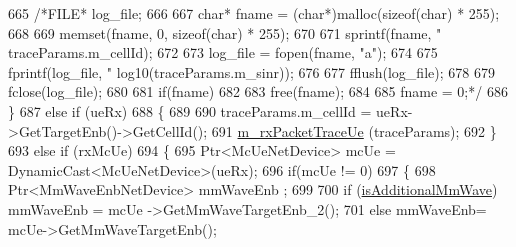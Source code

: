 \begin{DoxyCode}
665                                          \textcolor{comment}{/*FILE* log\_file;}
666 \textcolor{comment}{}
667 \textcolor{comment}{                                        char* fname = (char*)malloc(sizeof(char) * 255);}
668 \textcolor{comment}{}
669 \textcolor{comment}{                                        memset(fname, 0, sizeof(char) * 255);}
670 \textcolor{comment}{}
671 \textcolor{comment}{                                        sprintf(fname, "%
       traceParams.m\_cellId);}
672 \textcolor{comment}{}
673 \textcolor{comment}{                                        log\_file = fopen(fname, "a");}
674 \textcolor{comment}{}
675 \textcolor{comment}{                                        fprintf(log\_file, "%
      log10(traceParams.m\_sinr));}
676 \textcolor{comment}{}
677 \textcolor{comment}{                                        fflush(log\_file);}
678 \textcolor{comment}{}
679 \textcolor{comment}{                                        fclose(log\_file);}
680 \textcolor{comment}{}
681 \textcolor{comment}{                                        if(fname)}
682 \textcolor{comment}{}
683 \textcolor{comment}{                                        free(fname);}
684 \textcolor{comment}{}
685 \textcolor{comment}{                                        fname = 0;*/}
686                                 \}
687                                 \textcolor{keywordflow}{else} \textcolor{keywordflow}{if} (ueRx)
688                                 \{
689 
690                                         traceParams.m\_cellId = ueRx->GetTargetEnb()->GetCellId();
691                                         \hyperlink{classns3_1_1MmWaveSpectrumPhy_a9a0b7373bd200aebda3532c70e74e81d}{m\_rxPacketTraceUe} (traceParams);
692                                 \}
693                                 \textcolor{keywordflow}{else} \textcolor{keywordflow}{if} (rxMcUe)
694                                 \{
695                                         Ptr<McUeNetDevice> mcUe = DynamicCast<McUeNetDevice>(ueRx);
696                                         \textcolor{keywordflow}{if}(mcUe != 0)
697                                         \{
698                                                 Ptr<MmWaveEnbNetDevice> mmWaveEnb ;
699 
700                                                 \textcolor{keywordflow}{if} (\hyperlink{classns3_1_1MmWaveSpectrumPhy_a424e1d78317df52f798d7dee04f4c096}{isAdditionalMmWave})  mmWaveEnb = mcUe
      ->GetMmWaveTargetEnb\_2();
701                                                 \textcolor{keywordflow}{else} mmWaveEnb= mcUe->GetMmWaveTargetEnb();

\end{DoxyCode}
